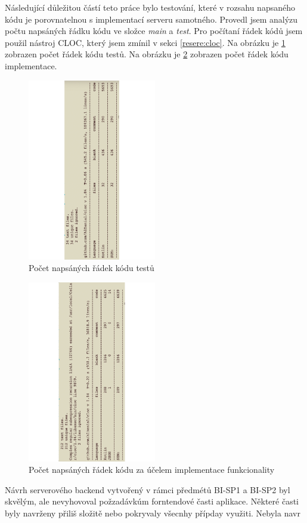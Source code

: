  Následující důležitou částí teto práce bylo testování, které v rozsahu napsaného kódu je porovnatelnou s implementací serveru samotného. Provedl jsem analýzu počtu napsáných řádku kódu ve složce \textit{main} a \textit{test}. Pro počítaní řádek kódů jsem použil nástroj CLOC, který jsem zmínil v sekci \ref{resere:cloc}. Na obrázku je \ref{image:code-count-test} zobrazen počet řádek kódu testů. Na obrázku je \ref{image:code-count-main} zobrazen počet řádek kódu implementace.
 \begin{figure}\centering
	   \includegraphics[angle=-90, width=0.5\textwidth]{pdfs/CodeAmountTests2}
	   \caption[Analýza kódu testů]{Počet napsáných řádek kódu testů}\label{image:code-count-test}
\end{figure}
 \begin{figure}\centering
	   \includegraphics[angle=-90, width=0.5\textwidth]{pdfs/CodeAmountImpl2}
	   \caption[Analýza kódu implementace]{Počet napsáných řádek kódu za účelem implementace funkcionality}\label{image:code-count-main}
\end{figure}


Návrh serverového backend vytvořený v rámci předmétů BI-SP1 a BI-SP2 byl skvělým, ale nevyhovoval požzadávkúm forntendové časti aplikace. Některé časti byly navrženy přiliš složitě nebo pokryvaly všecnhy přípday využiti. Nebyla navr